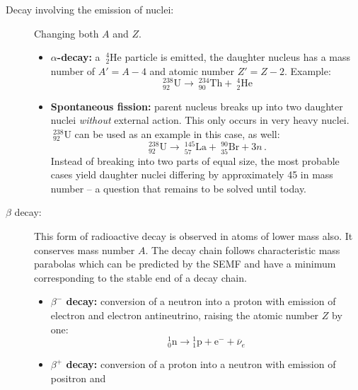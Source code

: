 \begin{description}
    \item [Decay involving the emission of nuclei:] Changing both $A$ and $Z$.
        \begin{itemize}
            \item
                \textbf{$\alpha$-decay:} a $~_2^4$He particle is emitted, the daughter nucleus 
                has a mass number of $A' = A - 4$ and atomic number $Z' = Z - 2$. Example:
                \begin{equation}
                    \mathrm{~^{238}_{92}U}\rightarrow\mathrm{~^{234}_{90}Th} + \mathrm{~^{4}_{2}He} 
                \end{equation}
            \item
                \textbf{Spontaneous fission:} parent nucleus breaks up into two daughter nuclei \emph{without}
                external action. This only occurs in very heavy nuclei. $\mathrm{~^{238}_{92}U}$ can be
                used as an example in this case, as well:
                \begin{equation}
                    \mathrm{~^{238}_{92}U}\rightarrow\mathrm{~^{145}_{57}La} + \mathrm{~^{90}_{35}Br} + 3n  \, .
                \end{equation}
                Instead of breaking into two parts of equal size, the most probable cases yield daughter 
                nuclei differing by approximately 45 in mass number -- a question that remains to be solved 
                until today.
        \end{itemize}
    \item [$\beta$ decay:]
        This form of radioactive decay is observed in atoms of lower mass also. 
        It conserves mass number $A$. The decay chain follows characteristic mass parabolas which 
        can be predicted by the SEMF and have a minimum corresponding to the stable end of a decay chain.
        \begin{itemize}
            \item
                \textbf{$\beta^-$ decay:} conversion of a neutron into a proton with emission of electron and 
                electron antineutrino, raising the atomic number $Z$ by one:
                \begin{equation}
                    {}^{1}_{0} \mathrm {n} \to {}^{1}_{1} \mathrm {p} + \mathrm{e}^{-} + \overline{\nu}_e 
                \end{equation}
            \item
                \textbf{$\beta^+$ decay:} conversion of a proton into a neutron with emission of positron and 

\end{itemize}
\end{description}
